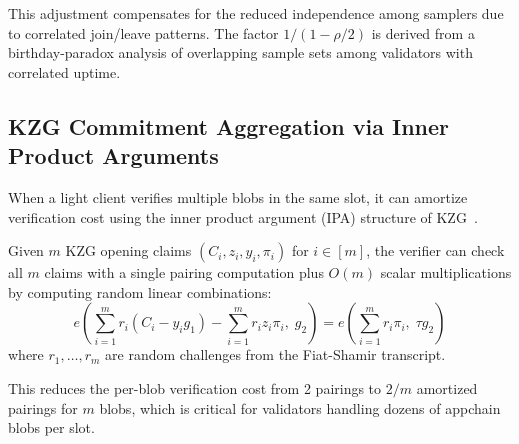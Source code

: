 This adjustment compensates for the reduced independence among samplers due to correlated
join/leave patterns. The factor $1/(1 - \rho/2)$ is derived from a birthday-paradox analysis
of overlapping sample sets among validators with correlated uptime.

\subsection{KZG Commitment Aggregation via Inner Product Arguments}

When a light client verifies multiple blobs in the same slot, it can amortize verification
cost using the inner product argument (IPA) structure of KZG~\cite{bowe2019recursive}.

\begin{proposition}
\label{prop:batched-verification}
Given $m$ KZG opening claims $(C_i, z_i, y_i, \pi_i)$ for $i \in [m]$, the verifier can
check all $m$ claims with a single pairing computation plus $O(m)$ scalar multiplications
by computing random linear combinations:
\[
    e\left(\sum_{i=1}^{m} r_i(C_i - y_i g_1) - \sum_{i=1}^{m} r_i z_i \pi_i,\; g_2\right)
    = e\left(\sum_{i=1}^{m} r_i \pi_i,\; \tau g_2\right)
\]
where $r_1, \ldots, r_m$ are random challenges from the Fiat-Shamir transcript.
\end{proposition}

This reduces the per-blob verification cost from 2 pairings to $2/m$ amortized pairings
for $m$ blobs, which is critical for validators handling dozens of appchain blobs per slot.


